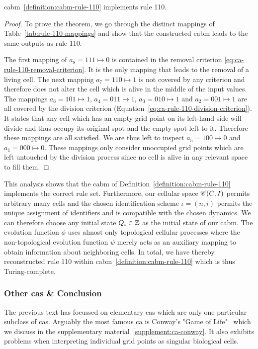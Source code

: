 \begin{proposition}
    \ac{cabm}~\ref{definition:cabm-rule-110} implements rule 110.
\end{proposition}
\begin{proof}
    To prove the theorem, we go through the distinct mappings of Table~\ref{tab:rule-110-mappings}
    and show that the constructed \ac{cabm} leads to the same outputs as rule 110.

    The first mapping of $a_8=111\mapsto0$ is contained in the removal criterion
    \eqref{eq:ca-rule-110-removal-criterion}.
    It is the only mapping that leads to the removal of a living cell.
    The next mapping $a_7=110\mapsto1$ is not covered by any criterion and therefore does not alter
    the cell which is alive in the middle of the input values.
    The mappings $a_6=101\mapsto1$, $a_4=011\mapsto1$, $a_3=010\mapsto1$ and $a_2=001\mapsto1$ are
    all
    covered by the division criterion (Equation~\ref{eq:ca-rule-110-division-criterion}).
    It states that any cell which has an empty grid point on its left-hand side will divide and thus
    occupy its original spot and the empty spot left to it.
    Therefore these mappings are all satisfied.
    We are thus left to inspect $a_5=100\mapsto0$ and $a_1=000\mapsto0$.
    These mappings only consider unoccupied grid points which are left untouched by the division
    process since no cell is alive in any relevant space to fill them.
\end{proof}

This analysis shows that the \ac{cabm} of Definition~\ref{definition:cabm-rule-110} implements the
correct rule set.
Furthermore, our cellular space $\mathscr{C}(C,I)$ permits arbitrary many cells and the chosen
identification scheme $\iota=(n,i)$ permits the unique assignment of identifiers and is compatible
with the chosen dynamics.
We can therefore choose any initial state $Q_i\in\mathbb{Z}$ as the initial state of our \ac{cabm}.
The evolution function $\phi$ uses almost only topological cellular processes where the
non-topological evolution function $\psi$ merely acts as an auxiliary mapping to obtain information
about neighboring cells.
In total, we have thereby reconstructed rule 110 within \ac{cabm}~\ref{definition:cabm-rule-110}
which is thus Turing-complete.

\subsubsection{Other \acp{ca} \& Conclusion}
The previous text has focussed on elementary \acp{ca} which are only one particular subclass of
\acp{ca}.
Arguably the most famous \ac{ca} is Conway's "Game of Life"~\cite{Gardner1969} which we discuss in
the supplementary material~\ref{supplement:ca-conway}.
It also exhibits problems when interpreting individual grid points as singular biological cells.

